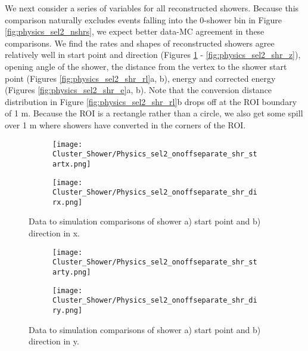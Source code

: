 \noindent We next consider a series of variables for all reconstructed showers. Because this comparison naturally excludes events falling into the 0-shower bin in Figure \ref{fig:physics_sel2_nshrs}, we expect better data-MC agreement in these comparisons. We find the rates and shapes of reconstructed showers agree relatively well in start point and direction (Figures \ref{fig:physics_sel2_shr_x} - \ref{fig:physics_sel2_shr_z}), opening angle of the shower, the distance from the vertex to the shower start point (Figures \ref{fig:physics_sel2_shr_rl}a, b), energy and corrected energy (Figures \ref{fig:physics_sel2_shr_e}a, b).  Note that the conversion distance distribution in Figure \ref{fig:physics_sel2_shr_rl}b drops off at the ROI boundary of 1 m.  Because the ROI is a rectangle rather than a circle, we also get some spill over 1 m where showers have converted in the corners of the ROI. 

\begin{figure}[t!]
\centering
  \begin{subfigure}[t]{0.3\textwidth}
    \centering
\texttt{[image: Cluster\_Shower/Physics\_sel2\_onoffseparate\_shr\_startx.png]}
  \caption{ }
  \end{subfigure} 
  \hspace{30mm}
  \begin{subfigure}[t]{0.3\textwidth}
    \centering
\texttt{[image: Cluster\_Shower/Physics\_sel2\_onoffseparate\_shr\_dirx.png]}
  \caption{ }
  \end{subfigure} 
\caption{ Data to simulation comparisons of shower a) start point and b) direction in x.}
\label{fig:physics_sel2_shr_x}
\end{figure}


\begin{figure}[h!]
\centering
  \begin{subfigure}[t]{0.3\textwidth}
    \centering
\texttt{[image: Cluster\_Shower/Physics\_sel2\_onoffseparate\_shr\_starty.png]}
  \caption{ }
  \end{subfigure} 
  \hspace{30mm}
  \begin{subfigure}[t]{0.3\textwidth}
    \centering
\texttt{[image: Cluster\_Shower/Physics\_sel2\_onoffseparate\_shr\_diry.png]}
  \caption{ }
  \end{subfigure} 

\caption{ Data to simulation comparisons of shower a) start point and b) direction in y.}
\label{fig:physics_sel2_shr_y}
\end{figure}


